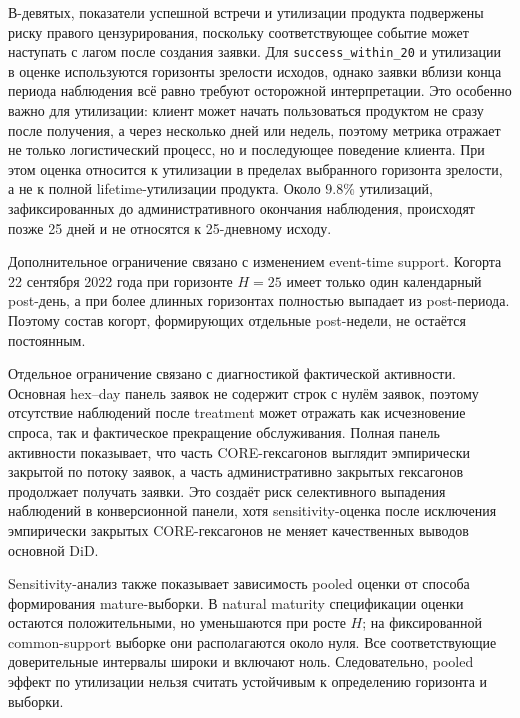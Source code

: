 \documentclass[14pt,a4paper]{extarticle}
\begin{document}
В-девятых, показатели успешной встречи и утилизации продукта подвержены риску правого цензурирования, поскольку соответствующее событие может наступать с лагом после создания заявки. Для \texttt{success\_within\_20} и утилизации в оценке используются горизонты зрелости исходов, однако заявки вблизи конца периода наблюдения всё равно требуют осторожной интерпретации. Это особенно важно для утилизации: клиент может начать пользоваться продуктом не сразу после получения, а через несколько дней или недель, поэтому метрика отражает не только логистический процесс, но и последующее поведение клиента. При этом оценка относится к утилизации в пределах выбранного горизонта
зрелости, а не к полной lifetime-утилизации продукта. Около \(9.8\%\)
утилизаций, зафиксированных до административного окончания наблюдения,
происходят позже 25 дней и не относятся к 25-дневному исходу.

Дополнительное ограничение связано с изменением event-time support.
Когорта 22 сентября 2022 года при горизонте \(H=25\) имеет только один
календарный post-день, а при более длинных горизонтах полностью выпадает
из post-периода. Поэтому состав когорт, формирующих отдельные post-недели,
не остаётся постоянным.

Отдельное ограничение связано с диагностикой фактической активности.
Основная hex--day панель заявок не содержит строк с нулём заявок, поэтому
отсутствие наблюдений после treatment может отражать как исчезновение спроса,
так и фактическое прекращение обслуживания. Полная панель активности показывает,
что часть CORE-гексагонов выглядит эмпирически закрытой по потоку заявок, а часть
административно закрытых гексагонов продолжает получать заявки. Это создаёт риск
селективного выпадения наблюдений в конверсионной панели, хотя sensitivity-оценка
после исключения эмпирически закрытых CORE-гексагонов не меняет качественных выводов
основной DiD.

Sensitivity-анализ также показывает зависимость pooled оценки от способа
формирования mature-выборки. В natural maturity спецификации оценки остаются
положительными, но уменьшаются при росте \(H\); на фиксированной
common-support выборке они располагаются около нуля.
Все соответствующие доверительные интервалы широки и включают ноль.
Следовательно, pooled эффект по утилизации нельзя считать устойчивым к
определению горизонта и выборки.
\end{document}
